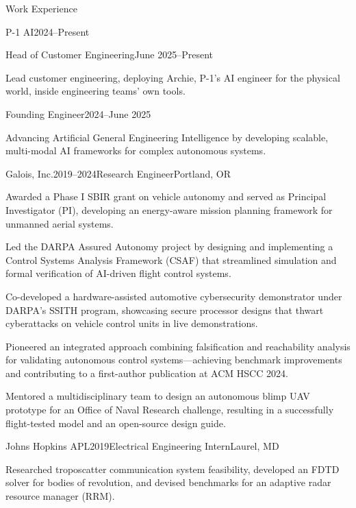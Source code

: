 \documentclass{resume}
\begin{document}
\begin{rSection}{Work Experience}

\begin{rCompany}{P-1 AI}{2024--Present}{}
\begin{rRole}{Head of Customer Engineering}{June 2025--Present}
\item Lead customer engineering, deploying Archie, P-1's AI engineer for the physical world, inside engineering teams' own tools.
\end{rRole}
\begin{rRole}{Founding Engineer}{2024--June 2025}
\item Advancing Artificial General Engineering Intelligence by developing scalable, multi-modal AI frameworks for complex autonomous systems.
\end{rRole}
\end{rCompany}

\begin{rSubsection}{Galois, Inc.}{2019--2024}{Research Engineer}{Portland, OR}
\item Awarded a Phase I SBIR grant on vehicle autonomy and served as Principal Investigator (PI), developing an energy-aware mission planning framework for unmanned aerial systems.
\item Led the DARPA Assured Autonomy project by designing and implementing a Control Systems Analysis Framework (CSAF) that streamlined simulation and formal verification of AI-driven flight control systems.
\item Co-developed a hardware-assisted automotive cybersecurity demonstrator under DARPA’s SSITH program, showcasing secure processor designs that thwart cyberattacks on vehicle control units in live demonstrations.
\item Pioneered an integrated approach combining falsification and reachability analysis for validating autonomous control systems—achieving benchmark improvements and contributing to a first-author publication at ACM HSCC 2024.
\item Mentored a multidisciplinary team to design an autonomous blimp UAV prototype for an Office of Naval Research challenge, resulting in a successfully flight-tested model and an open-source design guide.
\end{rSubsection}

\begin{rSubsection}{Johns Hopkins APL}{2019}{Electrical Engineering Intern}{Laurel, MD}
\item Researched troposcatter communication system feasibility, developed an FDTD solver for bodies of revolution, and devised benchmarks for an adaptive radar resource manager (RRM).
\end{rSubsection}


\end{rSection}
\end{document}
